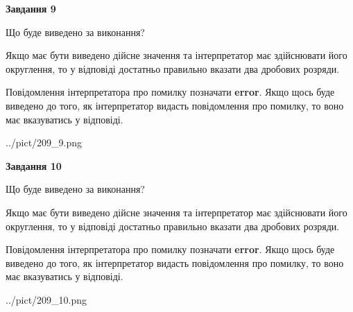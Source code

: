 \documentclass[12pt, ukrainian]{article}
\begin{document}
{\begin {Large}
{\begin {center}\textbf{Завдання 9}\end {center}}\par
Що буде виведено за виконання? \par

Якщо має бути виведено дійсне значення та інтерпретатор має здійснювати його округлення, 
то у відповіді достатньо правильно вказати два дробових розряди.

Повідомлення інтерпретатора про помилку позначати \textbf{error}.
Якщо щось буде виведено до того, як інтерпретатор видасть повідомлення про помилку, 
то воно має вказуватись у відповіді. \par

\begin{center}
	{../pict/209_9.png}
\end{center}
\newpage

{\begin {center}\textbf{Завдання 10}\end {center}}\par
Що буде виведено за виконання? \par

Якщо має бути виведено дійсне значення та інтерпретатор має здійснювати його округлення, 
то у відповіді достатньо правильно вказати два дробових розряди.

Повідомлення інтерпретатора про помилку позначати \textbf{error}.
Якщо щось буде виведено до того, як інтерпретатор видасть повідомлення про помилку, 
то воно має вказуватись у відповіді. \par

\begin{center}
	{../pict/209_10.png}
\end{center}
\newpage

\end {Large}}
\end{document}
